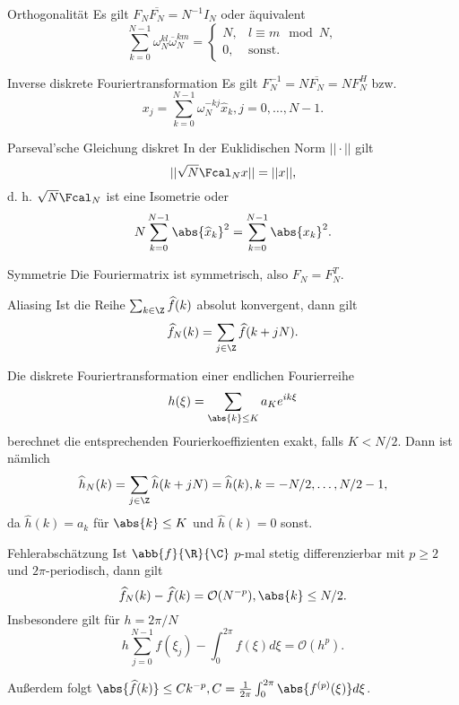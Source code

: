 \begin{karte}{Orthogonalität}
    Es gilt \( F_N \overline{F_N} = N^{-1} I_N \) 
    oder äquivalent 
    \[ \sum_{k=0}^{N-1} \omega_N^{kl} \overline{\omega}_N^{km} = 
    \begin{cases}
        N, & l \equiv m \mod N, \\
        0, & \text{sonst}.
    \end{cases} \]
\end{karte}

\begin{karte}{Inverse diskrete Fouriertransformation}
    Es gilt \( F_N^{-1} = N \overline{F_N} = N F_N^H \) bzw. 
    \[ x_j = \sum_{k=0}^{N-1} \omega_N^{-kj} \widehat{x}_k, j=0,\ldots, N-1. \]
\end{karte}

\begin{karte}{Parseval'sche Gleichung diskret}
    In der Euklidischen Norm \( ||\cdot|| \) gilt 
    \[ || \sqrt{N} \Fcal_N x||= ||x||, \]
    d. h. \( \sqrt{N} \Fcal_N \) ist eine Isometrie oder 
    \[ N \sum_{k=0}^{N-1} \abs{\widehat{x}_k}^2 = \sum_{k=0}^{N-1} \abs{x_k}^2. \]
\end{karte}

\begin{karte}{Symmetrie}
    Die Fouriermatrix ist symmetrisch, also 
    \( F_N = F_N^T \). 
\end{karte}

\begin{karte}{Aliasing}
    Ist die Reihe \(\sum_{k\in\Z} \widehat{f}(k)\) absolut konvergent, dann gilt 
    \[ \widehat{f}_N(k) = \sum_{j\in\Z} \widehat{f}(k+jN). \]

    Die diskrete Fouriertransformation einer endlichen Fourierreihe 
    \[ h(\xi) = \sum_{\abs{k}\leq K} a_K e^{ik\xi} \]
    berechnet die entsprechenden Fourierkoeffizienten exakt, falls \(K<N/2\). 
    Dann ist nämlich 
    \[ \widehat{h}_N(k) = \sum_{j\in\Z} \widehat{h}(k+jN) = \widehat{h}(k), k = -N/2,\ldots, N/2-1, \]
    da \(\widehat{h}(k) = a_k\) für \(\abs{k} \leq K\) und \(\widehat{h}(k) = 0\) sonst.
\end{karte}

\begin{karte}{Fehlerabschätzung}
    Ist \(\abb{f}{\R}{\C}\) \(p\)-mal stetig differenzierbar mit \(p\geq 2\) und 
    \(2\pi\)-periodisch, dann gilt 
    \[ \widehat{f}_N(k) - \widehat{f}(k) = \mathcal{O}(N^{-p}), \abs{k} \leq N/2. \]
    Insbesondere gilt für \(h=2\pi/N\)
    \[ h \sum_{j=0}^{N-1} f(\xi_j) - \int_0^{2\pi} f(\xi)d\xi = \mathcal{O}(h^p). \]

    Außerdem folgt \( \abs{\widehat{f}(k)} \leq C k^{-p}, C = \frac{1}{2\pi} \int_0^{2\pi} \abs{f^{(p)}(\xi)} d\xi \).
\end{karte}

